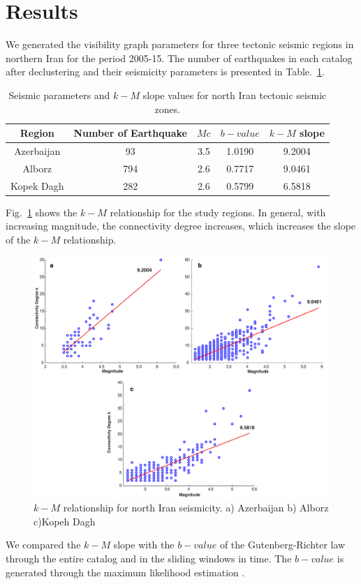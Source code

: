 \section{Results}
\noindent
We generated the visibility graph parameters for three tectonic seismic regions in northern Iran for the period 2005-15. The number of earthquakes in each catalog after declustering and their seismicity parameters is presented in Table.~\ref{tab:b_k_m_param}. 

\begin{table}[h]
\centering
\caption{Seismic parameters and $k-M$ slope values for north Iran tectonic seismic zones.}
\begin{tabular}{ccccc}
Region          & Number of Earthquake &  $Mc$ &  $b-value$ & $k-M$ slope \\ \hline
Azerbaijan     & 93                                 & 3.5   & 1.0190  & 9.2004       \\ \hline
Alborz            & 794                               & 2.6   & 0.7717  & 9.0461      \\ \hline
Kopek Dagh  & 282                               & 2.6   & 0.5799  & 6.5818     \\ \hline
\end{tabular}
\label{tab:b_k_m_param}
\end{table}

\noindent
Fig.~\ref{fig:k_m_plot_m}  shows the  $k-M$  relationship for the study regions.  In general, with increasing magnitude, the connectivity degree increases, which increases the slope of the  $k-M$  relationship. 

\begin{figure} [ht]
\centering
\includegraphics[scale=0.35]{figures/pdf/Figure05.pdf} 
\caption{ $k-M$ relationship for north Iran seismicity. a) Azerbaijan b) Alborz c)Kopeh Dagh}
\label{fig:k_m_plot_m}
\end{figure}
 \noindent
We compared the  $k-M$  slope with the  $b-value$  of the Gutenberg-Richter law through the entire catalog and in the sliding windows in time. The  $b-value$  is generated through the maximum likelihood estimation  \citep{Aki1965} .


